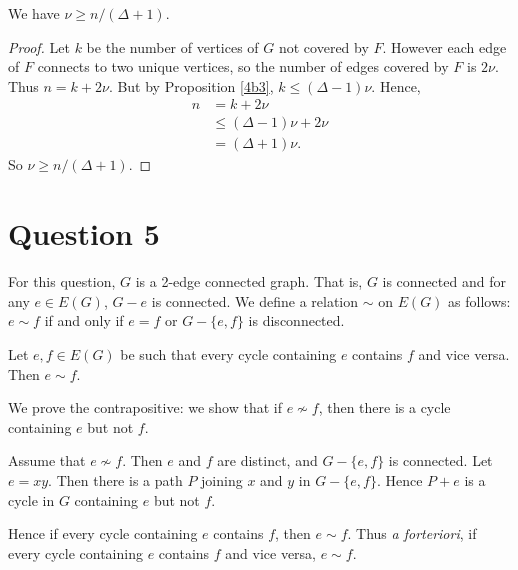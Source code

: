 \documentclass{unswmaths}
\begin{document}
\begin{proposition}
\label{4b4}
We have $\nu \geq n/(\Delta+1)$.
\end{proposition}
\begin{proof}
    Let $k$ be the number of vertices of $G$ not covered by $F$.
    However each edge of $F$ connects to two unique vertices, so the number
    of edges covered by $F$ is $2\nu$.
    Thus
    $n = k+2\nu$. But by Proposition \ref{4b3}, $k \leq (\Delta-1)\nu$.
    Hence,
    \begin{align}
        n &= k+2\nu\\
        &\leq (\Delta-1)\nu+2\nu\\
        &= (\Delta+1)\nu.
    \end{align}
    So $\nu \geq n/(\Delta+1)$.
\end{proof}

\section{Question 5}
For this question, $G$ is a 2-edge connected graph. That is, $G$
is connected and for any $e \in E(G)$, $G-e$ is connected. 
We define a relation $\sim$ on $E(G)$ as follows: $e \sim f$ if and only
if $e = f$ or $G - \{e,f\}$ is disconnected.
\begin{proposition}
\label{5a}
    Let $e,f \in E(G)$ be such that every cycle containing $e$ contains $f$
    and vice versa.
    Then $e \sim f$.
\end{proposition}
\begin{proposition}    
    We prove the contrapositive: we show that if $e \nsim f$, then there
    is a cycle containing $e$ but not $f$.
    
    Assume that $e \nsim f$. Then $e$ and $f$ are distinct, and $G - \{e,f\}$
    is connected. Let $e = xy$. Then there is a path $P$ joining $x$ and $y$
    in $G - \{e,f\}$. Hence $P+e$ is a cycle in $G$ containing $e$ but not $f$. 
    
    Hence if every cycle containing $e$ contains $f$, then $e \sim f$.
    Thus \emph{a forteriori}, if every cycle containing $e$ contains $f$
    and vice versa, $e \sim f$.
\end{proposition}
\end{document}

